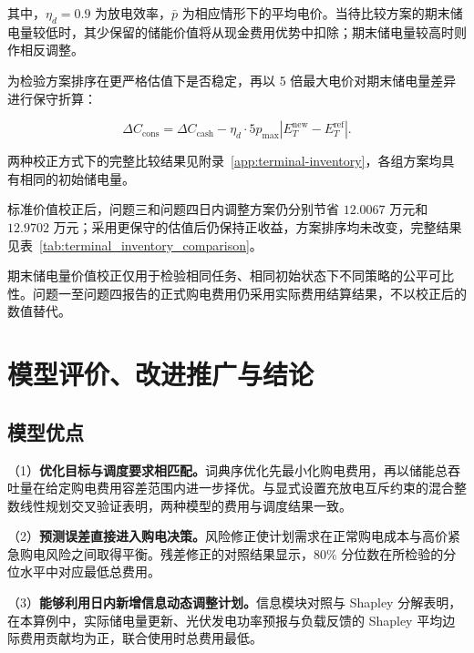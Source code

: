 \documentclass[12pt,a4paper]{ctexart}
\renewcommand{\textbf}[1]{{\CJKfamily{heiti}\bfseries #1}}
\begin{document}
\par\noindent 其中，$\eta_d=0.9$ 为放电效率，$\bar p$ 为相应情形下的平均电价。当待比较方案的期末储电量较低时，其少保留的储能价值将从现金费用优势中扣除；期末储电量较高时则作相反调整。

为检验方案排序在更严格估值下是否稳定，再以 5 倍最大电价对期末储电量差异进行保守折算：

\begin{equation}
\Delta C_{\mathrm{cons}}
=
\Delta C_{\mathrm{cash}}
-
\eta_d\cdot5p_{\max}
\left|
E_T^{\mathrm{new}}-E_T^{\mathrm{ref}}
\right|.
\label{eq:terminal_inventory_conservative}
\end{equation}

\par\noindent 两种校正方式下的完整比较结果见附录~\ref{app:terminal-inventory}，各组方案均具有相同的初始储电量。

\par\noindent\hspace*{2em}标准价值校正后，问题三和问题四日内调整方案仍分别节省 $12.0067$ 万元和 $12.9702$ 万元；采用更保守的估值后仍保持正收益，方案排序均未改变，完整结果见表~\ref{tab:terminal_inventory_comparison}。

期末储电量价值校正仅用于检验相同任务、相同初始状态下不同策略的公平可比性。问题一至问题四报告的正式购电费用仍采用实际费用结算结果，不以校正后的数值替代。


\section{模型评价、改进推广与结论}
\subsection{模型优点}
\par\noindent\hspace*{2em}（1）\textbf{优化目标与调度要求相匹配。}词典序优化先最小化购电费用，再以储能总吞吐量在给定购电费用容差范围内进一步择优。与显式设置充放电互斥约束的混合整数线性规划交叉验证表明，两种模型的费用与调度结果一致。

\par\noindent\hspace*{2em}（2）\textbf{预测误差直接进入购电决策。}风险修正使计划需求在正常购电成本与高价紧急购电风险之间取得平衡。残差修正的对照结果显示，$80\%$ 分位数在所检验的分位水平中对应最低总费用。

\par\noindent\hspace*{2em}（3）\textbf{能够利用日内新增信息动态调整计划。}信息模块对照与 Shapley 分解表明，在本算例中，实际储电量更新、光伏发电功率预报与负载反馈的 Shapley 平均边际费用贡献均为正，联合使用时总费用最低。
\end{document}
